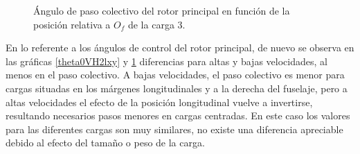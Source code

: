 \begin{figure}
	\centering
	\caption{Ángulo de paso colectivo del rotor principal en función de la posición relativa a $O_f$ de la carga 3.}
	\label{theta0VH3lxy}
\end{figure}

En lo referente a los ángulos de control del rotor principal, de nuevo se observa en las gráficas \ref{theta0VH2lxy} y \ref{theta0VH3lxy} diferencias para altas y bajas velocidades, al menos en el paso colectivo. A bajas velocidades, el paso colectivo es menor para cargas situadas en los márgenes longitudinales y a la derecha del fuselaje, pero a altas velocidades el efecto de la posición longitudinal vuelve a invertirse, resultando necesarios pasos menores en cargas centradas. En este caso los valores para las diferentes cargas son muy similares, no existe una diferencia apreciable debido al efecto del tamaño o peso de la carga.

